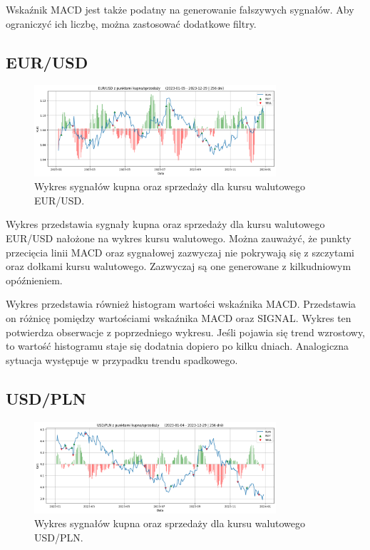 \documentclass[12pt, a4paper]{article}
\begin{document}
Wskaźnik MACD jest także podatny na generowanie fałszywych sygnałów. Aby ograniczyć
ich liczbę, można zastosować dodatkowe filtry.

\subsection{EUR/USD}

\begin{figure}[ht]
    \centering
    \includegraphics[width=0.8\textwidth]{eur_usd_value_buy_sell.png}
    \caption{Wykres sygnałów kupna oraz sprzedaży dla kursu walutowego EUR/USD.}
    \label{fig:eur_usd_value_buy_sell}
\end{figure}

Wykres przedstawia sygnały kupna oraz sprzedaży dla kursu walutowego EUR/USD
nałożone na wykres kursu walutowego. Można zauważyć, że punkty przecięcia linii MACD oraz sygnałowej
zazwyczaj nie pokrywają się z szczytami oraz dołkami kursu walutowego. Zazwyczaj są one generowane
z kilkudniowym opóźnieniem.

Wykres przedstawia również histogram wartości wskaźnika MACD. Przedstawia on różnicę
pomiędzy wartościami wskaźnika MACD oraz SIGNAL. Wykres ten potwierdza obserwacje z poprzedniego
wykresu. Jeśli pojawia się trend wzrostowy, to wartość histogramu staje się dodatnia dopiero
po kilku dniach. Analogiczna sytuacja występuje w przypadku trendu spadkowego.



\subsection{USD/PLN}

\begin{figure}[ht]
    \centering
    \includegraphics[width=0.8\textwidth]{usd_pln_value_buy_sell.png}
    \caption{Wykres sygnałów kupna oraz sprzedaży dla kursu walutowego USD/PLN.}
    \label{fig:usd_pln_value_buy_sell}
\end{figure}
\end{document}

